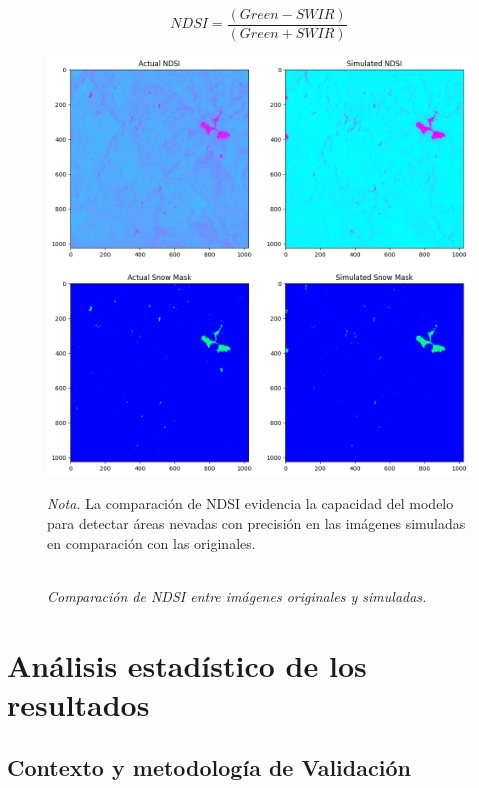                     \begin{equation}
                        NDSI = \frac{(Green - SWIR)}{(Green + SWIR)}
                    \end{equation}

                    \begin{figure}[H] 
                        \caption{\doublespacing \\ \textit{Comparación de NDSI entre imágenes originales y simuladas.}} 
                        \centering
                        \includegraphics[width=1\linewidth]{2_CAPITULO5/IMG/ndsi2.png}
                        \begin{justify}
                            \textit{Nota.} La comparación de NDSI evidencia la capacidad del modelo para detectar áreas nevadas con precisión en las imágenes simuladas en comparación con las originales.
                        \end{justify}                    
                        \label{ndsi2}
                    \end{figure}
        
    \section{Análisis estadístico de los resultados}
        \subsection{Contexto y metodología de Validación}


